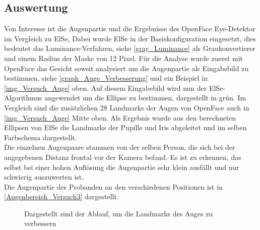 \subsection{Auswertung}
Von Interesse ist die Augenpartie und die Ergebnisse des OpenFace Eye-Detektor im Vergleich zu ElSe, Dabei wurde ElSe in der Basiskonfiguration eingesetzt, dies bedeutet das Luminance-Verfahren, siehe \autoref{gray_Luminance} als Graukonvertierer und einem Radius der Maske von 12 Pixel.
Für die Analyse wurde zuerst mit OpenFace das Gesicht soweit analysiert um die Augenpartie als Eingabebild zu bestimmen, siehe \autoref{graph_Auge_Verbesserung} und ein Beispiel in \autoref{img_Versuch_Auge} oben. Auf diesem Eingabebild wird nun der ElSe-Algorithmus angewendet um die Ellipse zu bestimmen, dargestellt in grün. Im Vergleich sind die zusätzlichen 28 Landmarks der Augen von OpenFace auch in \autoref{img_Versuch_Auge} Mitte oben. Als Ergebnis wurde aus den berechneten Ellipsen von ElSe die Landmarks der Pupille und Iris abgeleitet und im selben Farbschema dargestellt.\\
Die einzelnen Augenpaare stammen von der selben Person, die sich bei der angegebenen Distanz frontal vor der Kamera befand. Es ist zu erkennen, das selbst bei einer hohen Auflösung die Augenpartie sehr klein ausfällt und nur schwierig auszuwerten ist.\\
Die Augenpartie der Probanden an den verschiedenen Positionen ist in \autoref{Augenbereich_Versuch3} dargestellt.
\begin{figure}
	\centering
	
	\caption{Dargestellt sind der Ablauf, um die Landmarks des Auges zu verbessern}
	\label{graph_Auge_Verbesserung}
\end{figure}
